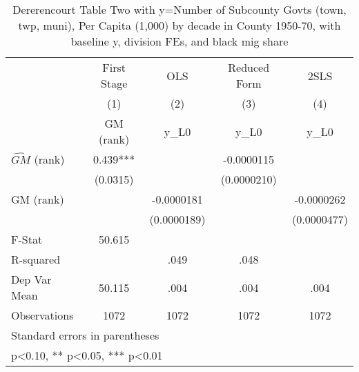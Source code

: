\begin{table}[htbp]\centering
\def\sym#1{\ifmmode^{#1}\else\(^{#1}\)\fi}
\caption{Dererencourt Table Two with y=Number of Subcounty Govts (town, twp, muni), Per Capita (1,000) by decade in County 1950-70, with baseline y, division FEs, and black mig share}
\begin{tabular}{l*{4}{c}}
\toprule
                    & First Stage   &         OLS   &Reduced Form   &        2SLS   \\
                    &\multicolumn{1}{c}{(1)}&\multicolumn{1}{c}{(2)}&\multicolumn{1}{c}{(3)}&\multicolumn{1}{c}{(4)}\\
                    &\multicolumn{1}{c}{GM  (rank)}&\multicolumn{1}{c}{y\_L0}&\multicolumn{1}{c}{y\_L0}&\multicolumn{1}{c}{y\_L0}\\
\midrule
$\hat{GM}$ (rank)   &       0.439***&               &  -0.0000115   &               \\
                    &    (0.0315)   &               & (0.0000210)   &               \\
\addlinespace
GM  (rank)          &               &  -0.0000181   &               &  -0.0000262   \\
                    &               & (0.0000189)   &               & (0.0000477)   \\
\midrule
F-Stat              &      50.615   &               &               &               \\
R-squared           &               &        .049   &        .048   &               \\
Dep Var Mean        &      50.115   &        .004   &        .004   &        .004   \\
Observations        &        1072   &        1072   &        1072   &        1072   \\
\bottomrule
\multicolumn{5}{l}{\footnotesize Standard errors in parentheses}\\
\multicolumn{5}{l}{\footnotesize * p<0.10, ** p<0.05, *** p<0.01}\\
\end{tabular}
\end{table}
